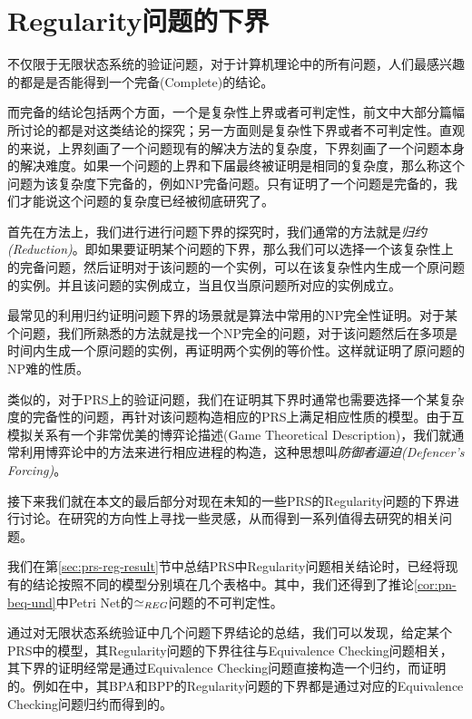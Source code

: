 \section{Regularity问题的下界}
\label{sec:lower-bound}

不仅限于无限状态系统的验证问题，对于计算机理论中的所有问题，人们最感兴趣的都是是否能得到一个完备(Complete)的结论。

而完备的结论包括两个方面，一个是复杂性上界或者可判定性，前文中大部分篇幅所讨论的都是对这类结论的探究；另一方面则是复杂性下界或者不可判定性。直观的来说，上界刻画了一个问题现有的解决方法的复杂度，下界刻画了一个问题本身的解决难度。如果一个问题的上界和下届最终被证明是相同的复杂度，那么称这个问题为该复杂度下完备的，例如NP完备问题。只有证明了一个问题是完备的，我们才能说这个问题的复杂度已经被彻底研究了。

首先在方法上，我们进行进行问题下界的探究时，我们通常的方法就是\emph{归约(Reduction)}。即如果要证明某个问题的下界，那么我们可以选择一个该复杂性上的完备问题，然后证明对于该问题的一个实例，可以在该复杂性内生成一个原问题的实例。并且该问题的实例成立，当且仅当原问题所对应的实例成立。

最常见的利用归约证明问题下界的场景就是算法中常用的NP完全性证明。对于某个问题，我们所熟悉的方法就是找一个NP完全的问题，对于该问题然后在多项是时间内生成一个原问题的实例，再证明两个实例的等价性。这样就证明了原问题的NP难的性质。

类似的，对于PRS上的验证问题，我们在证明其下界时通常也需要选择一个某复杂度的完备性的问题，再针对该问题构造相应的PRS上满足相应性质的模型。由于互模拟关系有一个非常优美的博弈论描述(Game Theoretical Description)，我们就通常利用博弈论中的方法来进行相应进程的构造，这种思想叫\emph{防御者逼迫(Defencer's Forcing)}\cite{Jancar2008}。

接下来我们就在本文的最后部分对现在未知的一些PRS的Regularity问题的下界进行讨论。在研究的方向性上寻找一些灵感，从而得到一系列值得去研究的相关问题。

我们在第\ref{sec:prs-reg-result}节中总结PRS中Regularity问题相关结论时，已经将现有的结论按照不同的模型分别填在几个表格中。其中，我们还得到了推论\ref{cor:pn-beq-und}中Petri Net的$\simeq_{REG}$问题的不可判定性。

通过对无限状态系统验证中几个问题下界结论的总结，我们可以发现，给定某个PRS中的模型，其Regularity问题的下界往往与Equivalence Checking问题相关，其下界的证明经常是通过Equivalence Checking问题直接构造一个归约，而证明的。例如在\cite{Srba2002b,Srba2002a}中，其BPA和BPP的Regularity问题的下界都是通过对应的Equivalence Checking问题归约而得到的。

